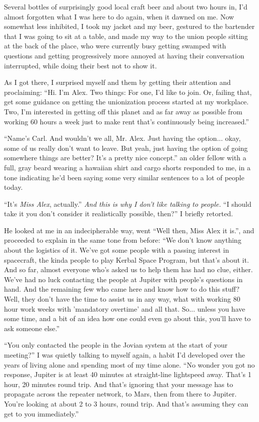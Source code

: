 \documentclass[a5paper]{report}%
\newcommand\spacer{{\center{$\cdots\\$}}}
\begin{document}
\spacer

Several bottles of surprisingly good local craft beer and about two hours in,
I'd almost forgotten what I was here to do again, when it dawned on me. Now
somewhat less inhibited, I took my jacket and my beer, gestured to the bartender
that I was going to sit at a table, and made my way to the union people sitting
at the back of the place, who were currently busy getting swamped with questions
and getting progressively more annoyed at having their conversation interrupted,
while doing their best not to show it.

As I got there, I surprised myself and them by getting their attention and
proclaiming: ``Hi. I'm Alex. Two things: For one, I'd like to join. Or, failing
that, get some guidance on getting the unionization process started at my
workplace. Two, I'm interested in getting off this planet and as far away as
possible from working 60 hours a week just to make rent that's continuously
being increased.''

``Name's Carl. And wouldn't we all, Mr. Alex. Just having the option... okay,
some of us really don't want to leave. But yeah, just having the option of going
somewhere things are better? It's a pretty nice concept.'' an older fellow with
a full, gray beard wearing a hawaiian shirt and cargo shorts responded to me, in
a tone indicating he'd been saying some very similar sentences to a lot of
people today.

``It's \textit{Miss Alex}, actually.'' \textit{And this is why I don't like
  talking to people.} ``I should take it you don't consider it realistically
possible, then?'' I briefly retorted.

He looked at me in an indecipherable way, went ``Well then, Miss Alex it is.'',
and proceeded to explain in the same tone from before: ``We
don't know anything about the logistics of it.  We've got some people with a
passing interest in spacecraft, the kinda people to play Kerbal Space Program,
but that's about it. And so
far, almost everyone who's asked us to help them has had no clue, either. We've
had no luck contacting the people at Jupiter with people's questions in hand.
And the remaining few who came here and know how to do this stuff? Well, they
don't have the time to assist us in any way, what with working 80 hour work
weeks with 'mandatory overtime' and all that. So... unless you have some time,
and a bit of an idea how one could even go about this, you'll have to ask
someone else.''

``You only contacted the people in the Jovian system at the start of your
meeting?'' I was quietly talking to myself again, a habit I'd developed over the
years of living alone and spending most of my time alone. ``No wonder you got no
response, Jupiter is at least 40 minutes at straight-line lightspeed away.
That's 1 hour, 20 minutes round trip. And that's ignoring that your message has
to propagate across the repeater network, to Mars, then from there to Jupiter.
You're looking at about 2 to 3 hours, round trip. And that's assuming they can
get to you immediately.''
\end{document}
